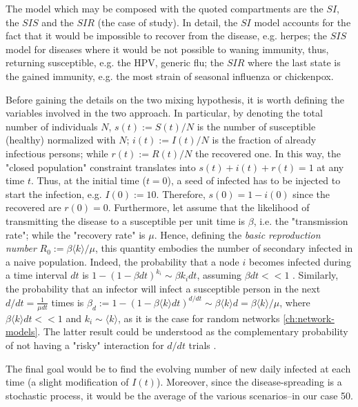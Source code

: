 \documentclass[a4paper,10pt,twoside]{book} %
\theoremstyle{definition}
\begin{document}
The model which may be composed with the quoted compartments are the $SI$, the $SIS$ and the $SIR$ (the case of study). In detail, the $SI$ model accounts for the fact that it would be impossible to recover from the disease, e.g. herpes; the $SIS$ model for diseases where it would be not possible to waning immunity, thus, returning susceptible, e.g. the HPV, generic flu; the $SIR$ where the last state is the gained immunity, e.g. the most strain of seasonal influenza or chickenpox.

Before gaining the details on the two mixing hypothesis, it is worth defining the variables involved in the two approach.
In particular, by denoting the total number of individuals $N$, $s(t) := S(t)/N$ is the number of susceptible (healthy) normalized with $N$; $i(t):=I(t)/N$ is the fraction of already infectious persons; while $r(t) := R(t)/N$ the recovered one. In this way, the "closed population" constraint translates into $s(t)+i(t)+r(t)=1$ at any time $t$. 
Thus, at the initial time ($t = 0$), a seed of infected has to be injected to start the infection, e.g. $I(0) := 10$. Therefore, $s(0) = 1 - i(0)$ since the recovered are $r(0) = 0$.
Furthermore, let assume that the likelihood of transmitting the disease to a susceptible per unit time is $\beta$, i.e. the "transmission rate"; while the "recovery rate" is $\mu$. Hence, defining the \textit{basic reproduction number}  $R_0 := \beta \langle k \rangle / \mu$, this quantity embodies the number of secondary infected in a naive population. Indeed, the probability that a node $i$  becomes infected during a time interval $dt$ is $1-(1-\beta dt)^{k_i} \sim \beta k_i dt$, assuming $ \beta dt << 1$ \cite{barabasi::2016networkbook}. Similarly, the probability that an infector will infect a susceptible person in the next $d/dt = \frac{1}{ \mu dt}$ times is $\beta_d:= 1-(1-\beta \langle k \rangle dt)^{d/dt} \sim \beta \langle k \rangle d = \beta \langle k \rangle/\mu$, where $ \beta \langle k \rangle dt << 1$ and $k_i \sim \langle k \rangle$, as it is the case for random networks \autoref{ch:network-models}. The latter result could be understood as the complementary probability of not having a "risky" interaction for $d/dt$ trials \cite{Thurner::Appendix_NetBasedExpl}. 

The final goal would be to find the evolving number of new daily infected at each time (a slight modification of $I(t)$). Moreover, since the disease-spreading is a stochastic process, it would be the average of the various scenarios--in our case 50.
\end{document}
